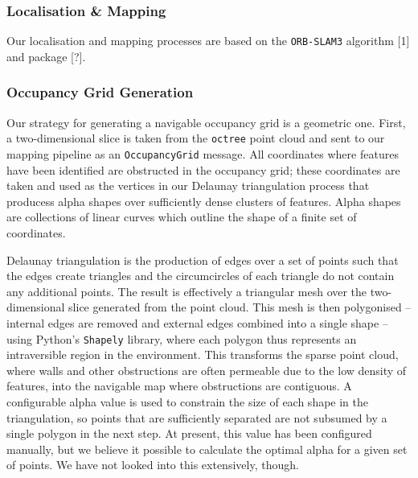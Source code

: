 \documentclass[10pt,english]{article}
\begin{document}
\subsubsection*{Localisation \& Mapping}

Our localisation and mapping processes are based on the \texttt{ORB-SLAM3} algorithm [1] and package [?]. %

\subsubsection*{Occupancy Grid Generation}

Our strategy for generating a navigable occupancy grid is a geometric one. First, a two-dimensional slice is taken from the \texttt{octree} point cloud and sent to our mapping pipeline as an \texttt{OccupancyGrid} message. All coordinates where features have been identified are obstructed in the occupancy grid; these coordinates are taken and used as the vertices in our Delaunay triangulation process that producess alpha shapes over sufficiently dense clusters of features. Alpha shapes are collections of linear curves which outline the shape of a finite set of coordinates.

Delaunay triangulation is the production of edges over a set of points such that the edges create triangles and the circumcircles of each triangle do not contain any additional points. The result is effectively a triangular mesh over the two-dimensional slice generated from the point cloud. This mesh is then polygonised -- internal edges are removed and external edges combined into a single shape -- using Python's \texttt{Shapely} library, where each polygon thus represents an intraversible region in the environment. This transforms the sparse point cloud, where walls and other obstructions are often permeable due to the low density of features, into the navigable map where obstructions are contiguous. A configurable alpha value is used to constrain the size of each shape in the triangulation, so points that are sufficiently separated are not subsumed by a single polygon in the next step. At present, this value has been configured manually, but we believe it possible to calculate the optimal alpha for a given set of points. We have not looked into this extensively, though.
\end{document}
